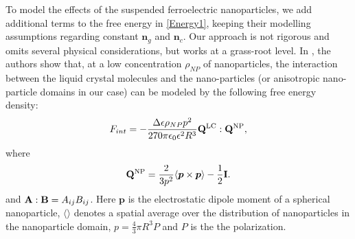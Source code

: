 \documentclass[reprint,amsfonts,amsmath,amssymb,aps,pre,floatfix,10pt]{revtex4-1}
\newcommand\n{\mathbf{n}}
\newcommand\Q{\mathbf{Q}}
\begin{document}
To model the effects of the suspended ferroelectric nanoparticles, we add additional terms to the free energy in \eqref{Energy1}, keeping their modelling assumptions regarding constant $\n_g$ and $\n_c$. Our approach is not rigorous and omits several physical considerations, but works at a grass-root level. %
In \cite{lopatina2009theory_13}, the authors show that, at a low concentration $\rho_{NP}$ of nanoparticles, the interaction between the liquid crystal molecules and the nano-particles (or anisotropic nano-particle domains in our case) can be modeled by the following free energy density:
\begin{equation}
F_{int} =  - \frac{\Delta \epsilon \rho_{NP} p^2}{270 \pi \epsilon_0 \epsilon^2 R^3} \Q^{\rm LC} : \Q^{\rm NP},
\end{equation}
where 
\begin{equation}
  \Q^{\rm NP} = \frac{2}{3 p^2}  \langle {\bm p} \times {\bm p} \rangle - \frac{1}{2} {\bf I}.
\end{equation}
and ${\bf A} : {\bf B} = A_{ij} B_{ij}$. Here ${\bm p}$ is the electrostatic dipole moment of a spherical nanoparticle, $\langle \rangle$ denotes a spatial average over the distribution of nanoparticles in the nanoparticle domain, $p = {\frac{4}{3} \pi R^3} P$ and $P$ is the the polarization. 
\end{document}
